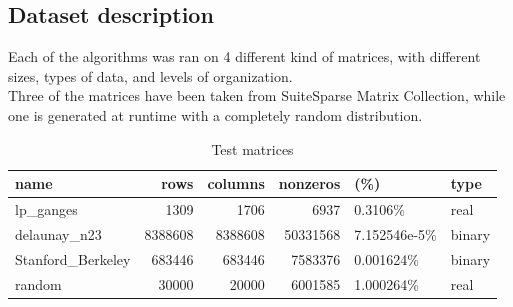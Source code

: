 \documentclass[conference]{IEEEtran}
\begin{document}
\subsection{Dataset description}
Each of the algorithms was ran on 4 different kind of matrices, with different sizes, types of data, and levels of organization.\\
Three of the matrices have been taken from SuiteSparse Matrix Collection, while one is generated at runtime with a completely random distribution.
\begin{table}[ht!]
    \centering
    \begin{adjustbox}{width=\columnwidth}
        \begin{tabular}{l|r|r|rl|l}
            name & rows & columns & nonzeros & (\%) & type \\
            \hline
            lp\_ganges\footnote & 1309 & 1706 & 6937 & 0.3106\% & real \\
            delaunay\_n23\footnotemark & 8388608 & 8388608 & 50331568 & 7.152546e-5\% & binary \\
            Stanford\_Berkeley\footnotemark & 683446 & 683446 & 7583376 & 0.001624\% & binary \\
            random & 30000 & 20000 & 6001585 & 1.000264\% & real \\
        \end{tabular}
    \end{adjustbox}
    \caption{Test matrices}
    \label{tab:matrices}
\end{table}
\end{document}
